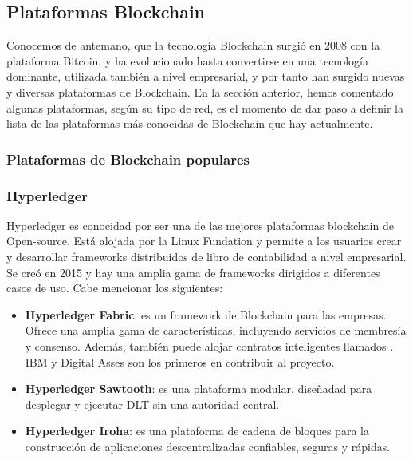 \subsection{Plataformas Blockchain}

Conocemos de antemano, que la tecnología Blockchain surgió en 2008 con la plataforma Bitcoin, y ha evolucionado hasta
convertirse en una tecnología dominante, utilizada también a nivel empresarial, y por tanto han surgido nuevas y 
diversas plataformas de Blockchain. En la sección anterior, hemos comentado algunas plataformas, según su tipo de red,
es el momento de dar paso a definir la lista de las plataformas más conocidas de Blockchain que hay actualmente.

\subsubsection{Plataformas de Blockchain populares}

\subsubsection*{Hyperledger}

Hyperledger es conocidad por ser una de las mejores plataformas blockchain de Open-source. Está alojada por la Linux 
Fundation y permite a los usuarios crear y desarrollar frameworks distribuidos de libro de contabilidad a nivel 
empresarial. Se creó en 2015 y hay una amplia gama de frameworks dirigidos a diferentes casos de uso. Cabe mencionar
los siguientes: 
    
\begin{itemize}
    \item \textbf{Hyperledger Fabric}: es un framework de Blockchain para las empresas. Ofrece una amplia gama de 
    características, incluyendo servicios de membresía y consenso. Además, también puede alojar contratos inteligentes 
    llamados . IBM y Digital Asses son los primeros en contribuir al proyecto.
    \item \textbf{Hyperledger Sawtooth}: es una plataforma modular, diseñadad para desplegar y ejecutar DLT sin una
    autoridad central.
    \item \textbf{Hyperledger Iroha}: es una plataforma de cadena de bloques para la construcción de aplicaciones 
    descentralizadas confiables, seguras y rápidas.
\end{itemize}

\vspace{5mm}

